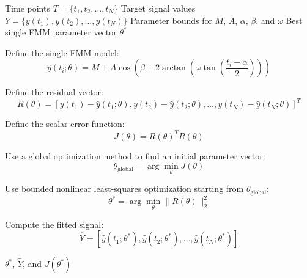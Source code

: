 \documentclass[a4paper]{article}
\begin{document}
        \begin{algorithm}[htbp]
		\caption{Single FMM Approximation of a Two-Component FMM Signal}
        \begin{algorithmic}[1]
            \Require Time points \(T = \{t_1,t_2,\dots,t_N\}\)
            \Require Target signal values \(Y = \{y(t_1),y(t_2),\dots,y(t_N)\}\)
            \Require Parameter bounds for \(M\), \(A\), \(\alpha\), \(\beta\), and \(\omega\)
            \Ensure Best single FMM parameter vector \(\theta^{*}\)
            
            \State Define the single FMM model:
            \[
                \hat{y}(t_i; \theta)
                =
                M
                +
                A
                \cos
                \left(
                    \beta
                    +
                    2
                    \arctan
                    \left(
                        \omega
                        \tan
                        \left(
                            \frac{t_i-\alpha}{2}
                        \right)
                    \right)
                \right)
            \]
            
            \State Define the residual vector:
            \[
                R(\theta)
                =
                \left[
                    y(t_1)-\hat{y}(t_1;\theta),
                y(t_2)-\hat{y}(t_2;\theta),
                    \dots,
                y(t_N)-\hat{y}(t_N;\theta)
                \right]^{T}
            \]
            
            \State Define the scalar error function:
            \[
                J(\theta)
                =
                R(\theta)^{T}R(\theta)
            \]
            
            \State Use a global optimization method to find an initial parameter vector:
            \[
                \theta_{\mathrm{global}}
                =
                \arg\min_{\theta}
                J(\theta)
            \]
            
            \State Use bounded nonlinear least-squares optimization starting from \(\theta_{\mathrm{global}}\):
            \[
                \theta^{*}
                =
                \arg\min_{\theta}
                \|R(\theta)\|_2^2
            \]
            
            \State Compute the fitted signal:
            \[
                \hat{Y}
                =
                \left[
                    \hat{y}(t_1;\theta^{*}),
                    \hat{y}(t_2;\theta^{*}),
                    \dots,
                    \hat{y}(t_N;\theta^{*})
                \right]
            \]
            
            \State \Return \(\theta^{*}\), \(\hat{Y}\), and \(J(\theta^{*})\)
        \end{algorithmic}
        \end{algorithm}
    
\end{document}
